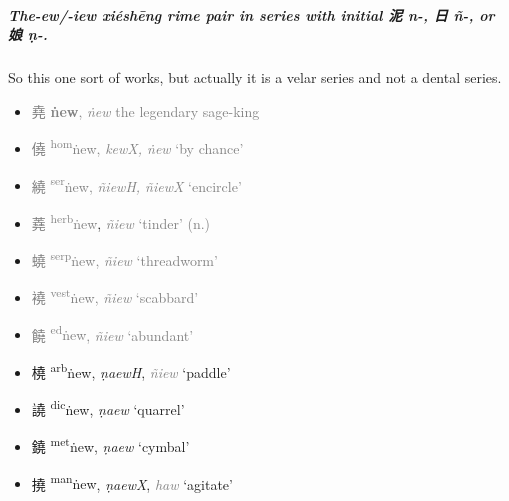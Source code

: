 \subparagraph{The-\textit{ew}/-\textit{iew} \textit{xiéshēng} rime pair in series with initial 泥 \textit{n}-, 日 \textit{ñ}-, or 娘  \textit{ṇ}-.}


So this one sort of works, but actually it is a velar series and not a dental series. 


\begin{itemize}

  \item {\textcolor{gray}{
    {\Large{堯}} %
      {\large{\textbf{ṅew}}},
      \textit{ṅew} the legendary sage-king        %
  }}

  \item {\textcolor{gray}{
    {\Large{僥}} %
      {\large{{\textsuperscript{hom}ṅew}}},
      \textit{kewX, ṅew} %
      `by chance'
  }}

  \item {\textcolor{gray}{
    {\Large{繞}}}} %
      {\textcolor{gray}{{\large{{\textsuperscript{ser}}ṅew}},
      \textit{ñiewH, ñiewX} `encircle'}}        %
  

  \item {\textcolor{gray}{
    {\Large{蕘}}}} %
      {\textcolor{gray}{\large{\textsuperscript{herb}ṅew}}},
      {\textcolor{gray}{\textit{ñiew} `tinder' (n.)}}        %
 


  \item {\textcolor{gray}{{\Large{蟯}}}} %
      {\textcolor{gray}{{\large{{\textsuperscript{serp}ṅew}}},}}
      {\textcolor{gray}{\textit{ñiew} %
      `threadworm'}}

  \item {\textcolor{gray}{
    {\Large{襓}} %
      {\large{{\textsuperscript{vest}ṅew}}},
      \textit{ñiew} %
      `scabbard'
  }}

  \item {\textcolor{gray}{
    {\Large{饒}} %
      {\large{{\textsuperscript{ed}ṅew}}},
      \textit{ñiew} %
      `abundant'
  }}

  \item {\Large{橈}} %
      {\large{{\textsuperscript{arb}ṅew}}},
      \textit{ṇaewH}, {\textcolor{gray}{\textit{ñiew}}} %
      `paddle'

  \item {\Large{譊}} %
      {\large{{\textsuperscript{dic}ṅew}}},
      \textit{ṇaew} %
      `quarrel'

  \item {\Large{鐃}} %
      {\large{{\textsuperscript{met}ṅew}}},
      \textit{ṇaew} %
      `cymbal'

  \item {\Large{撓}} %
      {\large{{\textsuperscript{man}ṅew}}},
      \textit{ṇaewX}, {\textcolor{gray}{\textit{haw}}} %
      `agitate'

\end{itemize}


